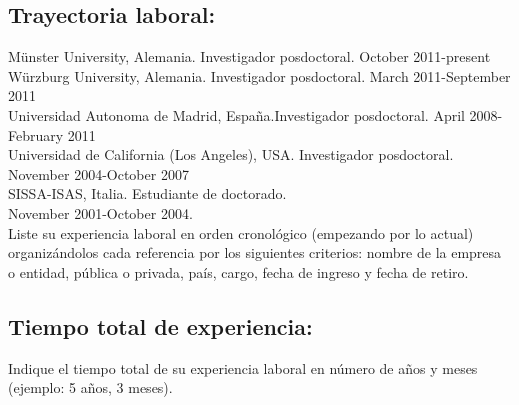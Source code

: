 \subsection{Trayectoria laboral:}
\begin{instrucciones}
M\"unster University, Alemania. Investigador posdoctoral. October 2011-present\\
W\"urzburg University, Alemania. Investigador posdoctoral. March 2011-September 2011\\
Universidad Autonoma de Madrid, España.Investigador posdoctoral. April 2008-February 2011\\
Universidad de California (Los Angeles), USA. Investigador posdoctoral. November 2004-October 2007\\
SISSA-ISAS, Italia. Estudiante de doctorado.\\ November 2001-October 2004.\\

  Liste su experiencia laboral en orden cronológico (empezando por lo
  actual) organizándolos cada referencia por los siguientes criterios:
  nombre de la empresa o entidad, pública o privada, país, cargo,
  fecha de ingreso y fecha de retiro.
\end{instrucciones}
\subsection{Tiempo total de experiencia:}
\begin{instrucciones}
  Indique el tiempo total de su experiencia laboral en número de años
  y meses (ejemplo: 5 años, 3 meses).
\end{instrucciones}


